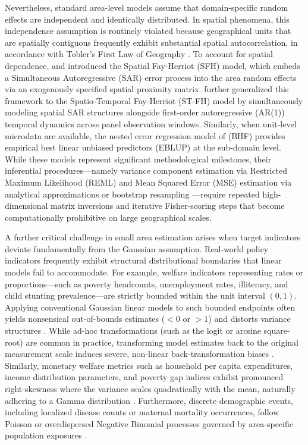 Nevertheless, standard area-level models assume that domain-specific random effects are independent and identically distributed. In spatial phenomena, this independence assumption is routinely violated because geographical units that are spatially contiguous frequently exhibit substantial spatial autocorrelation, in accordance with Tobler's First Law of Geography \citep{tobler1970computer}. To account for spatial dependence, \citet{petrucci2006small} and \citet{pratesi2008small} introduced the Spatial Fay-Herriot (SFH) model, which embeds a Simultaneous Autoregressive (SAR) error process into the area random effects via an exogenously specified spatial proximity matrix. \citet{marhuenda2013small} further generalized this framework to the Spatio-Temporal Fay-Herriot (ST-FH) model by simultaneously modeling spatial SAR structures alongside first-order autoregressive (AR(1)) temporal dynamics across panel observation windows. Similarly, when unit-level microdata are available, the nested error regression model of \citet{battese1988error} (BHF) provides empirical best linear unbiased predictors (EBLUP) at the sub-domain level. While these models represent significant methodological milestones, their inferential procedures---namely variance component estimation via Restricted Maximum Likelihood (REML) and Mean Squared Error (MSE) estimation via analytical approximations or bootstrap resampling \citep{gonzalez2008bootstrap}---require repeated high-dimensional matrix inversions and iterative Fisher-scoring steps that become computationally prohibitive on large geographical scales.

A further critical challenge in small area estimation arises when target indicators deviate fundamentally from the Gaussian assumption. Real-world policy indicators frequently exhibit structural distributional boundaries that linear models fail to accommodate. For example, welfare indicators representing rates or proportions---such as poverty headcounts, unemployment rates, illiteracy, and child stunting prevalence---are strictly bounded within the unit interval $(0, 1)$. Applying conventional Gaussian linear models to such bounded endpoints often yields nonsensical out-of-bounds estimates ($< 0$ or $> 1$) and distorts variance structures \citep{janicki2020properties, denicolo2022tipsae}. While ad-hoc transformations (such as the logit or arcsine square-root) are common in practice, transforming model estimates back to the original measurement scale induces severe, non-linear back-transformation biases \citep{slud2006mean}. Similarly, monetary welfare metrics such as household per capita expenditures, income distribution parameters, and poverty gap indices exhibit pronounced right-skewness where the variance scales quadratically with the mean, naturally adhering to a Gamma distribution \citep{ghosh2004small, fabrizi2011hierarchical}. Furthermore, discrete demographic events, including localized disease counts or maternal mortality occurrences, follow Poisson or overdispersed Negative Binomial processes governed by area-specific population exposures \citep{boubeta2016empirical, boubeta2017poisson}.

